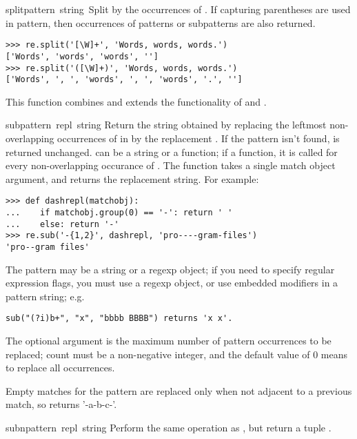 \begin{funcdesc}{split}{pattern\, string\, }
  Split  by the occurrences of .  If
  capturing parentheses are used in pattern, then occurrences of
  patterns or subpatterns are also returned.
%
\bcode\begin{verbatim}
>>> re.split('[\W]+', 'Words, words, words.')
['Words', 'words', 'words', '']
>>> re.split('([\W]+)', 'Words, words, words.')
['Words', ', ', 'words', ', ', 'words', '.', '']
\end{verbatim}\ecode
%
  This function combines and extends the functionality of
   and .
\end{funcdesc}

\begin{funcdesc}{sub}{pattern\, repl\, string}
Return the string obtained by replacing the leftmost non-overlapping
occurrences of  in  by the replacement
.  If the pattern isn't found,  is returned
unchanged.   can be a string or a function; if a function,
it is called for every non-overlapping occurance of .
The function takes a single match object argument, and 
returns the replacement string.  For example:
%
\bcode\begin{verbatim}
>>> def dashrepl(matchobj):
...    if matchobj.group(0) == '-': return ' '
...    else: return '-'
>>> re.sub('-{1,2}', dashrepl, 'pro----gram-files')
'pro--gram files'
\end{verbatim}\ecode
%
The pattern may be a string or a
regexp object; if you need to specify regular expression flags, you
must use a regexp object, or use embedded modifiers in a pattern
string; e.g.
%
\bcode\begin{verbatim}
sub("(?i)b+", "x", "bbbb BBBB") returns 'x x'.
\end{verbatim}\ecode
%
The optional argument  is the maximum number of pattern
occurrences to be replaced; count must be a non-negative integer, and
the default value of 0 means to replace all occurrences.

Empty matches for the pattern are replaced only when not adjacent to a
previous match, so  returns '-a-b-c-'.
\end{funcdesc}

\begin{funcdesc}{subn}{pattern\, repl\, string}
Perform the same operation as , but return a tuple
.
\end{funcdesc}

